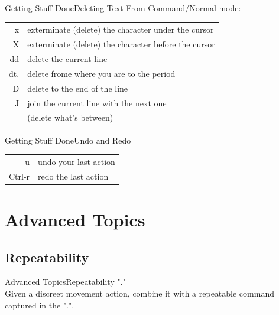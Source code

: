 \documentclass{beamer}
\begin{document}
\begin{frame}[c]{Getting Stuff Done}{Deleting Text}
    From Command/Normal mode:
    \begin{table}[htpb]
        \centering
        \begin{tabular}{r|l}
            x    & exterminate (delete) the character under the cursor \\
            X    & exterminate (delete) the character before the cursor \\
            dd   & delete the current line \\
            dt.  & delete frome where you are to the period \\
            D    & delete to the end of the line \\
            J    & join the current line with the next one \\
                 & (delete what's between) \\
        \end{tabular}
    \end{table}
\end{frame}


\begin{frame}[t]{Getting Stuff Done}{Undo and Redo}
    \begin{table}[htpb]
        \centering
        \begin{tabular}{r|l}
            u      & undo your last action \\
            Ctrl-r & redo the last action \\
        \end{tabular}
    \end{table}
\end{frame}

\section{Advanced Topics}

\subsection{Repeatability}
\begin{frame}[t]{Advanced Topics}{Repeatability}
    \vspace{2cm}
    \centering
    "." \\
    \vspace{1cm}
    Given a discreet movement action, combine it with a repeatable command captured in the ".".
\end{frame}
\end{document}
